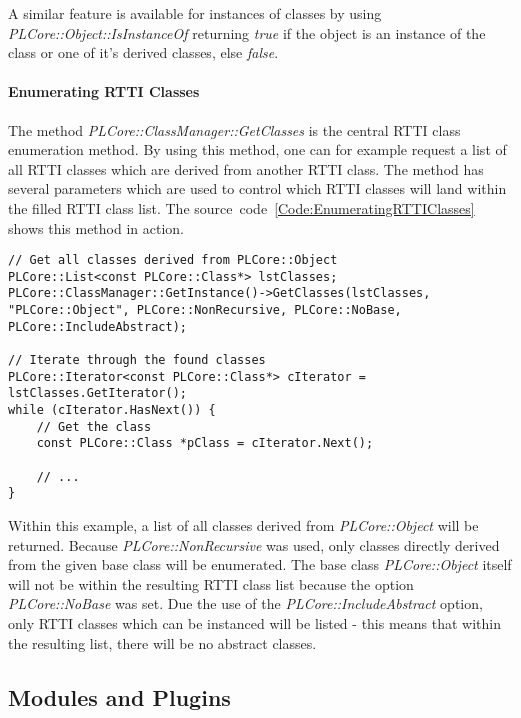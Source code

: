 A similar feature is available for instances of classes by using \emph{PLCore::Object::IsInstanceOf} returning \emph{true} if the object is an instance of the class or one of it's derived classes, else \emph{false}.


\paragraph{Enumerating RTTI Classes}
The method \emph{PLCore::ClassManager::GetClasses} is the central RTTI class enumeration method. By using this method, one can for example request a list of all RTTI classes which are derived from another RTTI class. The method has several parameters which are used to control which RTTI classes will land within the filled RTTI class list. The source~code~\ref{Code:EnumeratingRTTIClasses} shows this method in action.
\begin{lstlisting}[float=htb,label=Code:EnumeratingRTTIClasses,caption={Enumerating RTTI classes}]
// Get all classes derived from PLCore::Object
PLCore::List<const PLCore::Class*> lstClasses;
PLCore::ClassManager::GetInstance()->GetClasses(lstClasses, "PLCore::Object", PLCore::NonRecursive, PLCore::NoBase, PLCore::IncludeAbstract);

// Iterate through the found classes
PLCore::Iterator<const PLCore::Class*> cIterator = lstClasses.GetIterator();
while (cIterator.HasNext()) {
	// Get the class
	const PLCore::Class *pClass = cIterator.Next();

	// ...
}
\end{lstlisting}
Within this example, a list of all classes derived from \emph{PLCore::Object} will be returned. Because \emph{PLCore::NonRecursive} was used, only classes directly derived from the given base class will be enumerated. The base class \emph{PLCore::Object} itself will not be within the resulting RTTI class list because the option \emph{PLCore::NoBase} was set. Due the use of the \emph{PLCore::IncludeAbstract} option, only RTTI classes which can be instanced will be listed - this means that within the resulting list, there will be no abstract classes.




\subsection{Modules and Plugins}
